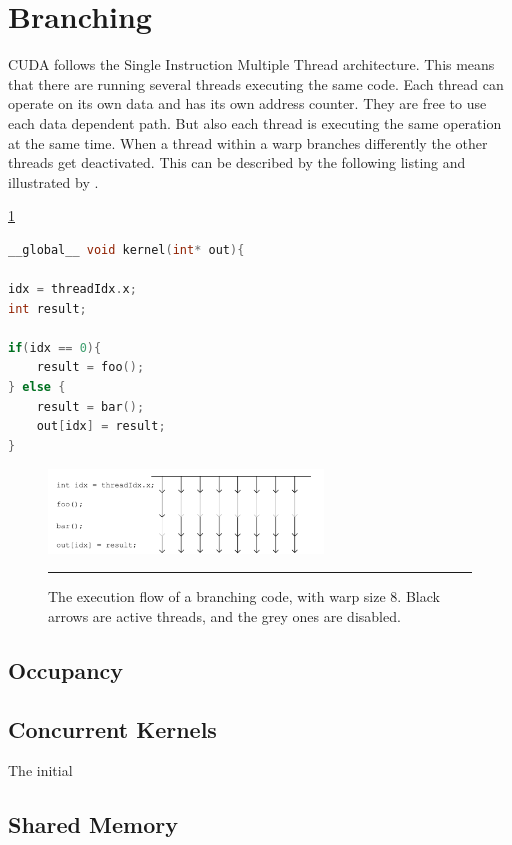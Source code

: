  
 \section{Branching}
 
 CUDA follows the Single Instruction Multiple Thread architecture. This means that there are running several threads executing the same code. Each thread can operate on its own data and has its own address counter. They are free to use each data dependent path. But also each thread is executing the same operation at the same time. When a thread within a warp branches differently the other threads get deactivated. This can be described by the following listing and illustrated by \cite{hoermanngpu}.
 
 \ref{fig:threads}
 
\begin{lstlisting}[language=C++, caption={CPU Vector Addition}]
__global__ void kernel(int* out){
 
idx = threadIdx.x;
int result;

if(idx == 0){
	result = foo();
} else {
	result = bar();
	out[idx] = result;
}
\end{lstlisting}


\begin{figure}[htbp]
	\centering
		\includegraphics[width=0.65\textwidth]{Figures/threads.png}
		\rule{35em}{0.2pt}
	\caption[he execution flow]{The execution flow of a branching code, with warp size 8. Black arrows are active threads, and the grey ones are disabled.
}
	\label{fig:threads}
\end{figure}



\subsection{Occupancy}
 

\subsection{Concurrent Kernels}

The initial 

\subsection{Shared Memory}

